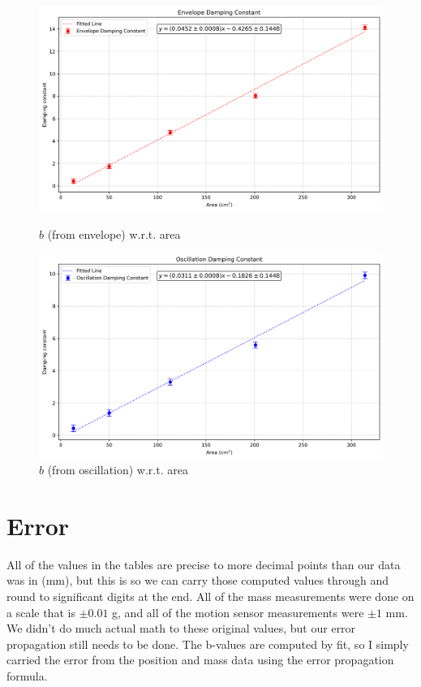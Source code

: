 \documentclass[12pt,letterpaper]{article}
\begin{document}
\begin{figure}[ht]
    \centering
      \includegraphics[width=\linewidth]{images/b-area_envelope_damping_constant.png}
      \caption{$b$ (from envelope) w.r.t. area}\label{fig:benv}
    \endminipage\hfill
      \includegraphics[width=\linewidth]{images/b-area_oscillation_damping_constant.png}
      \caption{$b$ (from oscillation) w.r.t. area}\label{fig:bosc}
    \endminipage\hfill
\end{figure}

\section{Error}

All of the values in the tables are precise to more decimal points than our data was in (mm), but this is so we can carry those computed values through and round to significant digits at the end. All of the mass measurements were done on a scale that is $± 0.01$ g, and all of the motion sensor measurements were $± 1$ mm. We didn't do much actual math to these original values, but our error propagation still needs to be done. The b-values are computed by fit, so I simply carried the error from the position and mass data using the error propagation formula.
\end{document}
